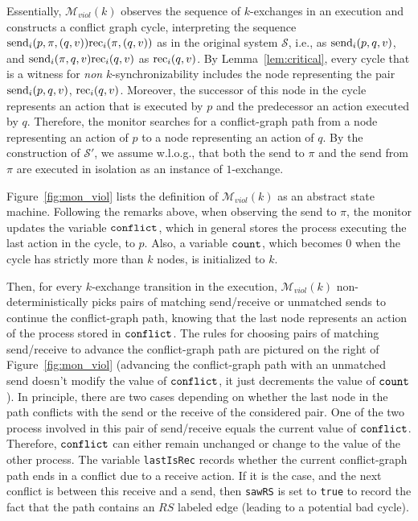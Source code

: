 Essentially, $\mathcal{M}_{\mathit{viol}}(k)$ observes the sequence of $k$-exchanges in an execution and constructs a conflict graph cycle, interpreting the sequence $\mathrm{send}_{i}({p,\pi,(q,v)})\mathrm{rec}_{i}({\pi,(q,v)})$ as in the original system $\mathcal{S}$, i.e., as $\mathrm{send}_{i}({p,q,v})$, and $\mathrm{send}_{i}({\pi,q,v})\mathrm{rec}_{i}({q,v})$ as $\mathrm{rec}_{i}({q,v})$. 
By Lemma~\ref{lem:critical}, every cycle that is a witness for \emph{non} $k$-synchronizability includes the node representing the pair $\mathrm{send}_{i}({p,q,v})$, $\mathrm{rec}_{i}({q,v})$. Moreover, the successor of this node in the cycle represents an action that is executed by $p$ and the predecessor an action executed by $q$. Therefore, the monitor searches for a conflict-graph path from a node representing an action of $p$ to a node representing an action of $q$. By the construction of $\mathcal{S'}$, we assume w.l.o.g., that both the send to $\pi$ and the send from $\pi$ are executed in isolation as an instance of $1$-exchange.

Figure~\ref{fig:mon_viol} lists the definition of $\mathcal{M}_{\mathit{viol}}(k)$ as an abstract state machine. Following the remarks above, when observing the send to $\pi$, the monitor updates the variable ${\tt conflict}$, which in general stores the process executing the last action in the cycle, to $p$. Also, a variable ${\tt count}$, which becomes $0$ when the cycle has strictly more than $k$ nodes, is initialized to $k$. 

Then, for every $k$-exchange transition in the execution, $\mathcal{M}_{\mathit{viol}}(k)$ non-deterministically picks pairs of matching send/receive or unmatched sends to continue the conflict-graph path, knowing that the last node represents an action of the process stored in ${\tt conflict}$. The rules for choosing pairs of matching send/receive to advance the conflict-graph path are pictured on the right of Figure~\ref{fig:mon_viol} (advancing the conflict-graph path with an unmatched send doesn't modify the value of ${\tt conflict}$, it just decrements the value of ${\tt count}$). In principle, there are two cases depending on whether the last node in the path conflicts with the send or the receive of the considered pair. One of the two process involved in this pair of send/receive equals the current value of ${\tt conflict}$. Therefore, ${\tt conflict}$ can either remain unchanged or change to the value of the other process. The variable {\tt lastIsRec} records whether the current conflict-graph path ends in a conflict due to a receive action. If it is the case, and the next conflict is between this receive and a send, then {\tt sawRS} is set to {\tt true} to record the fact that the path contains an $RS$ labeled edge (leading to a potential bad cycle).

